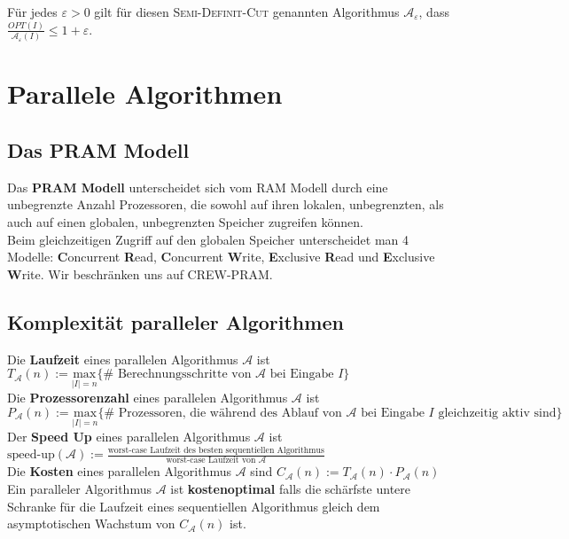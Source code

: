 \documentclass[a4paper,10pt]{scrartcl}
\newcommand{\tbf}{\textbf}
\newcommand{\tsc}{\textsc}
\newcommand{\calA}{\mathcal{A}}
\begin{document}
Für jedes $\varepsilon > 0$ gilt für diesen \tsc{Semi-Definit-Cut} genannten Algorithmus $\calA_\varepsilon$, dass $\frac{OPT(I)}{\calA_\varepsilon(I)} \leq 1 + \varepsilon$.

\newpage
\section{Parallele Algorithmen}
\subsection{Das PRAM Modell}
Das \tbf{PRAM Modell} unterscheidet sich vom RAM Modell durch eine unbegrenzte Anzahl Prozessoren, die sowohl auf ihren lokalen, unbegrenzten, als auch auf einen globalen, unbegrenzten Speicher zugreifen können. \\

Beim gleichzeitigen Zugriff auf den globalen Speicher unterscheidet man 4 Modelle: \tbf{C}oncurrent \tbf{R}ead, \tbf{C}oncurrent \tbf{W}rite, \tbf{E}xclusive \tbf{R}ead und \tbf{E}xclusive \tbf{W}rite. Wir beschränken uns auf CREW-PRAM. \\

\subsection{Komplexität paralleler Algorithmen}
Die \tbf{Laufzeit} eines parallelen Algorithmus $\calA$ ist \\
$T_\calA(n) := \underset{|I| = n}{\text{max}}\{ \# \text{ Berechnungsschritte von } \calA \text{ bei Eingabe } I \}$ \\

Die \tbf{Prozessorenzahl} eines parallelen Algorithmus $\calA$ ist \\
$P_\calA(n) := \underset{|I| = n}{\text{max}}\{ \# \text{ Prozessoren, die während des Ablauf von } \calA \text{ bei Eingabe } I \text{ gleichzeitig aktiv sind} \}$ \\

Der \tbf{Speed Up} eines parallelen Algorithmus $\calA$ ist $\text{speed-up}(\calA) := \frac{\text{worst-case Laufzeit des besten sequentiellen Algorithmus}}{\text{worst-case Laufzeit von } \calA}$ \\

Die \tbf{Kosten} eines parallelen Algorithmus $\calA$ sind $C_\calA(n) := T_\calA(n) \cdot P_\calA(n)$ \\

Ein paralleler Algorithmus $\calA$ ist \tbf{kostenoptimal} falls die schärfste untere Schranke für die Laufzeit eines sequentiellen Algorithmus gleich dem asymptotischen Wachstum von $C_\calA(n)$ ist. \\
\end{document}
